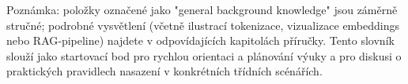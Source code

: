 Poznámka: položky označené jako "general background knowledge" jsou záměrně stručné; podrobné vysvětlení (včetně ilustrací tokenizace, vizualizace embeddings nebo RAG‑pipeline) najdete v odpovídajících kapitolách příručky. Tento slovník slouží jako startovací bod pro rychlou orientaci a plánování výuky a pro diskusi o praktických pravidlech nasazení v konkrétních třídních scénářích.